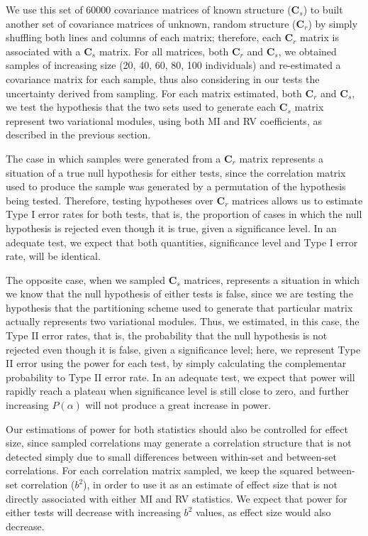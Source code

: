 \documentclass[12pt,]{article}
\begin{document}
We use this set of 60000 covariance matrices of known structure
($\mathbf{C}_s$) to built another set of covariance matrices of unknown,
random structure ($\mathbf{C}_r$) by simply shuffling both lines and
columns of each matrix; therefore, each $\mathbf{C}_r$ matrix is
associated with a $\mathbf{C}_s$ matrix. For all matrices, both
$\mathbf{C}_r$ and $\mathbf{C}_s$, we obtained samples of increasing
size (20, 40, 60, 80, 100 individuals) and re-estimated a covariance
matrix for each sample, thus also considering in our tests the
uncertainty derived from sampling. For each matrix estimated, both
$\mathbf{C}_r$ and $\mathbf{C}_s$, we test the hypothesis that the two
sets used to generate each $\mathbf{C}_s$ matrix represent two
variational modules, using both MI and RV coefficients, as described in
the previous section.

The case in which samples were generated from a $\mathbf{C}_r$ matrix
represents a situation of a true null hypothesis for either tests, since
the correlation matrix used to produce the sample was generated by a
permutation of the hypothesis being tested. Therefore, testing
hypotheses over $\mathbf{C}_r$ matrices allows us to estimate Type I
error rates for both tests, that is, the proportion of cases in which
the null hypothesis is rejected even though it is true, given a
significance level. In an adequate test, we expect that both quantities,
significance level and Type I error rate, will be identical.

The opposite case, when we sampled $\mathbf{C}_s$ matrices, represents a
situation in which we know that the null hypothesis of either tests is
false, since we are testing the hypothesis that the partitioning scheme
used to generate that particular matrix actually represents two
variational modules. Thus, we estimated, in this case, the Type II error
rates, that is, the probability that the null hypothesis is not rejected
even though it is false, given a significance level; here, we represent
Type II error using the power for each test, by simply calculating the
complementar probability to Type II error rate. In an adequate test, we
expect that power will rapidly reach a plateau when significance level
is still close to zero, and further increasing $P(\alpha)$ will not
produce a great increase in power.

Our estimations of power for both statistics should also be controlled
for effect size, since sampled correlations may generate a correlation
structure that is not detected simply due to small differences between
within-set and between-set correlations. For each correlation matrix
sampled, we keep the squared between-set correlation ($b^2$), in order
to use it as an estimate of effect size that is not directly associated
with either MI and RV statistics. We expect that power for either tests
will decrease with increasing $b^2$ values, as effect size would also
decrease.
\end{document}
